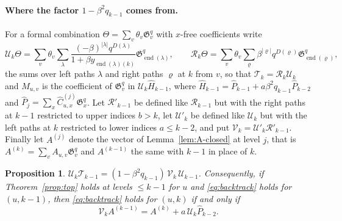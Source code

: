 \documentclass[11pt]{article}
\newtheorem{proposition}{Proposition}
\newcommand{\G}{\mathfrak{G}}
\begin{document}
\paragraph{Where the factor $1-\beta^2q_{k-1}$ comes from.}
For a formal combination $\Theta=\sum_v\theta_v\G^q_v$ with $x$-free
coefficients write
\[
 \mathcal U_k\Theta=\sum_v\theta_v\sum_{\lambda}
   \frac{(-\beta)^{|\lambda|}q^{D(\lambda)}}{1+\beta y_{\operatorname{end}(\lambda)(k)}}
   \G^q_{\operatorname{end}(\lambda)},
 \qquad
 \mathcal R_k\Theta=\sum_v\theta_v\sum_{\varrho}\beta^{|\varrho|}q^{D(\varrho)}
   \G^q_{\operatorname{end}(\varrho)},
\]
the sums over left paths $\lambda$ and right paths $\varrho$ at $k$
from $v$, so that $\mathcal T_k=\mathcal R_k\mathcal U_k$ and
$M_{u,v}$ is the coefficient of $\G^q_v$ in
$\mathcal U_k\widehat H_{k-1}$, where
$\widehat H_{k-1}=\widehat P_{k-1}+a\beta^2q_{k-1}\widehat P_{k-2}$
and $\widehat P_j=\sum_x\widehat C^{(j)}_{u,x}\G^q_x$. Let
$\mathcal R'_{k-1}$ be defined like $\mathcal R_{k-1}$ but with the
right paths at $k-1$ restricted to upper indices $b>k$, let
$\mathcal U'_k$ be defined like $\mathcal U_k$ but with the left paths
at $k$ restricted to lower indices $a\leq k-2$, and put
$\mathcal V_k=\mathcal U'_k\mathcal R'_{k-1}$. Finally let $A^{(j)}$
denote the vector of Lemma~\ref{lem:A-closed} at level $j$, that is
$A^{(k)}=\sum_vA_{u,v}\G^q_v$ and $A^{(k-1)}$ the same with $k-1$ in
place of $k$.

\begin{proposition}\label{prop:step-identity}
$\mathcal U_k\mathcal T_{k-1}=(1-\beta^2q_{k-1})\,\mathcal V_k\,\mathcal U_{k-1}$.
Consequently, if Theorem~\ref{prop:top} holds at levels
$\leq k-1$ for $u$ and \eqref{eq:backtrack} holds for $(u,k-1)$, then
\eqref{eq:backtrack} holds for $(u,k)$ if and only if
\begin{equation}\label{eq:step-identity}
 \mathcal V_k A^{(k-1)}=A^{(k)}+a\,\mathcal U_k\widehat P_{k-2}.
\end{equation}
\end{proposition}
\end{document}
